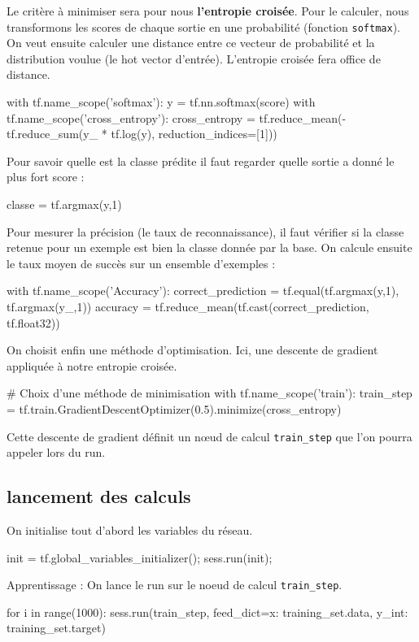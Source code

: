 \documentclass[a4paper,11pt]{book}
\begin{document}
Le critère à minimiser sera pour nous \textbf{l'entropie croisée}.
Pour le calculer, nous transformons les scores de chaque sortie en une probabilité (fonction \verb+softmax+). On veut ensuite calculer une distance entre ce vecteur de probabilité et la distribution voulue (le hot vector d'entrée). L'entropie croisée fera office de distance.
\begin{mypython}
with tf.name_scope('softmax'):
	y = tf.nn.softmax(score)
with tf.name_scope('cross_entropy'):
	cross_entropy = tf.reduce_mean(-tf.reduce_sum(y_ * tf.log(y), reduction_indices=[1]))
\end{mypython}

Pour savoir quelle est la classe prédite il faut regarder quelle sortie a donné le plus fort score :
\begin{mypython}
classe = tf.argmax(y,1)    
\end{mypython}

Pour mesurer la précision (le taux de reconnaissance), il faut vérifier si la classe retenue pour un exemple est bien la classe donnée par la base. On calcule ensuite le taux moyen de succès sur un ensemble d'exemples :
\begin{mypython}
with tf.name_scope('Accuracy'):
	correct_prediction = tf.equal(tf.argmax(y,1), tf.argmax(y_,1))
	accuracy = tf.reduce_mean(tf.cast(correct_prediction, tf.float32))
\end{mypython}

On choisit enfin une méthode d'optimisation. Ici, une descente de gradient appliquée à notre entropie croisée.
\begin{mypython}
# Choix d'une méthode de minimisation
with tf.name_scope('train'):
	train_step = tf.train.GradientDescentOptimizer(0.5).minimize(cross_entropy)
\end{mypython}
Cette descente de gradient définit un nœud de calcul \verb+train_step+ que l'on pourra appeler lors du run.

\subsection{lancement des calculs}
On initialise tout d'abord les variables du réseau.
\begin{mypython}
init = tf.global_variables_initializer();
sess.run(init);
\end{mypython}

Apprentissage : On lance le run sur le noeud de calcul \verb+train_step+.
\begin{mypython}
for i in range(1000):
  sess.run(train_step, feed_dict={x: training_set.data, y_int: training_set.target})
\end{mypython}
\end{document}
